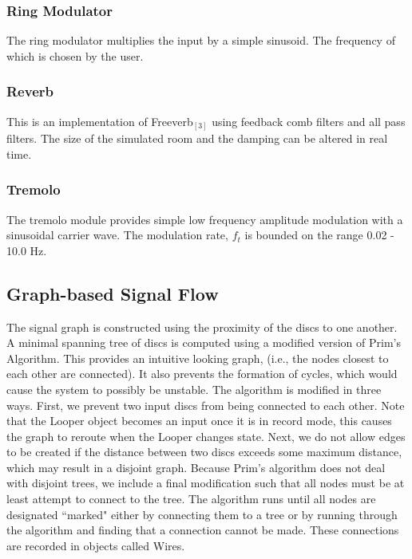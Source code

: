 \documentclass[pdftext,twoside,10pt]{article}
\begin{document}
\subsubsection*{Ring Modulator}
The ring modulator multiplies the input by a simple sinusoid. The frequency of which is chosen by the user.

\subsubsection*{Reverb}
This is an implementation of Freeverb$_{[3]}$ using feedback comb filters and all pass filters. The size of the simulated room and the damping can be altered in real time.

\subsubsection*{Tremolo} 
The tremolo module provides simple low frequency amplitude modulation with a sinusoidal carrier wave. The modulation rate, $f_t$ is bounded on the range 0.02 - 10.0 Hz.


\subsection{Graph-based Signal Flow}
The signal graph is constructed using the proximity of the discs to one another. A minimal spanning tree of discs is computed using a modified version of Prim's Algorithm. This provides an intuitive looking graph, (i.e., the nodes closest to each other are connected). It also prevents the formation of cycles, which would cause the system to possibly be unstable. The algorithm is modified in three ways. First, we prevent two input discs from being connected to each other. Note that the Looper object becomes an input once it is in record mode, this causes the graph to reroute when the Looper changes state.  Next, we do not allow edges to be created if the distance between two discs exceeds some maximum distance, which may result in a disjoint graph. Because Prim's algorithm does not deal with disjoint trees, we include a final modification such that all nodes must be at least attempt to connect to the tree. The algorithm runs until all nodes are designated ``marked" either by connecting them to a tree or by running through the algorithm and finding that a connection cannot be made. These connections are recorded in objects called Wires.
\end{document}
